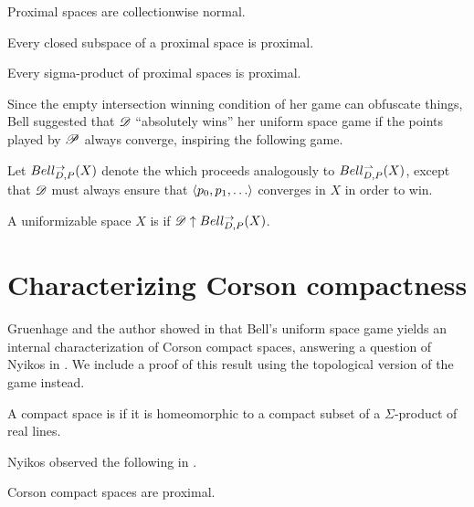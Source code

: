 \begin{thm}
  Proximal spaces are collectionwise normal.
\end{thm}

\begin{thm}
  Every closed subspace of a proximal space is proximal.
\end{thm}

\begin{thm}
  Every sigma-product of proximal spaces is proximal.
\end{thm}

Since the empty intersection winning condition of her game can obfuscate things,
Bell suggested that $\mathscr{D}$ ``absolutely wins'' her uniform space game
if the points played by $\mathscr{P}$ always converge, inspiring the following game.

\begin{defn}
  Let $Bell_{D,P}^{\to}(X)$ denote the
   which
  proceeds analogously to $Bell_{D,P}^{\rightharpoonup}(X)$, except
  that $\mathscr{D}$ must always ensure that $\<p_0,p_1,\dots\>$ converges
  in $X$ in order to win.
\end{defn}

\begin{defn}
  A uniformizable space $X$ is  if
  $\mathscr{D} \uparrow Bell_{D,P}^{\to}(X)$.
\end{defn}



\section{Characterizing Corson compactness}

Gruenhage and the author showed in \cite{MR3227201} that Bell's uniform space
game yields an internal characterization of Corson compact spaces, answering
a question of Nyikos in \cite{nyikosProximalPreprint}. We include a proof
of this result using the topological version of the game instead.

\begin{defn}
  A compact space is  if it is homeomorphic to a compact
  subset of a $\Sigma$-product of real lines.
\end{defn}

Nyikos observed the following in \cite{nyikosProximalPreprint}.

\begin{prop}
  Corson compact spaces are proximal.
\end{prop}

